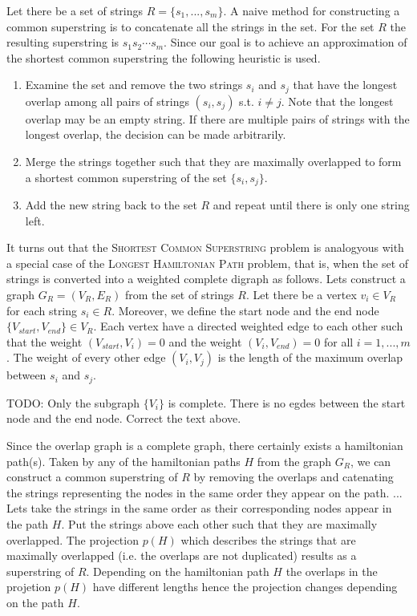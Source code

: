 \documentclass[english,twoside,censored,csm,algorithms-track-2020]{HYthesisML}
\theoremstyle{plain}
\theoremstyle{definition}
\begin{document}
Let there be a set of strings $R=\{s_1,...,s_m\}$. A naive method for constructing a common superstring is
to concatenate all the strings in the set. For the set $R$ the resulting superstring is $s_1s_2\cdots s_m$.
Since our goal is to achieve an approximation of the shortest common superstring the following heuristic
is used.

\begin{enumerate}
\item Examine the set and remove the two strings $s_i$ and $s_j$ that have the longest overlap among all pairs of strings $(s_i, s_j)$ s.t. $i\neq j$. Note that the longest overlap may be an empty string. If there are multiple pairs of strings with the longest overlap, the decision can be made arbitrarily.
\item Merge the strings together such that they are maximally overlapped to form a shortest common superstring of the set $\{s_i, s_j\}$.
  \item Add the new string back to the set $R$ and repeat until there is only one string left.
\end{enumerate}

It turns out that the \textsc{Shortest Common Superstring} problem is analogyous with a special case of
the \textsc{Longest Hamiltonian Path} problem, that is, when the set of strings is converted into
a weighted complete digraph as follows. Lets construct a graph $G_R=(V_R,E_R)$ from the set of strings $R$.
Let there be a vertex $v_i\in V_R$ for each string $s_i\in R$. Moreover, we define the start node and
the end node $\{V_{start},V_{end}\}\in V_R$. Each vertex have a directed weighted edge to each other
such that the weight $(V_{start}, V_i) = 0$ and the weight $(V_i, V_{end}) = 0$ for all $i=1,...,m$.
The weight of every other edge $(V_i, V_j)$ is the length of the maximum overlap between $s_i$ and $s_j$.

TODO: Only the subgraph $\{V_i\}$ is complete. There is no egdes between the start node and the end node.
Correct the text above.


Since the overlap graph is a complete graph, there certainly exists a hamiltonian path(s). Taken by any
of the hamiltonian paths $H$ from the graph $G_R$, we can construct a common superstring of $R$ by
removing the overlaps and catenating the strings representing the nodes in the same order they appear
on the path.
...
Lets take the strings in the same order as their corresponding nodes appear in the path $H$. Put the
strings above each other such that they are maximally overlapped. The projection $p(H)$ which describes
the strings that are maximally overlapped (i.e. the overlaps are not duplicated) results as a
superstring of $R$. Depending on the hamiltonian path $H$ the overlaps in the projetion $p(H)$ have
different lengths hence the projection changes depending on the path $H$. 
\end{document}
